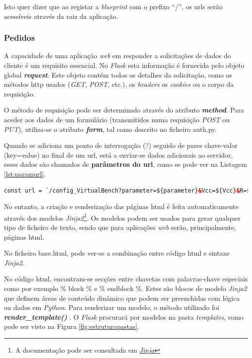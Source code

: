 Isto quer dizer que ao registar a \textit{blueprint} com o prefixo ``/'', os \acrshort{url}s serão acessíveis através da raiz da aplicação.

\subsubsection{Pedidos}
A capacidade de uma aplicação \textit{web} em responder a solicitações de dados do cliente é um requisito essencial. No \textit{Flask} esta informação é fornecida pelo objeto global \textit{\textbf{request}}. Este objeto contém todos os detalhes da solicitação, como os métodos \acrshort{http} usados (\textit{GET}, \textit{POST}, etc.), os \textit{headers} os \textit{cookies} ou o corpo da requisição.

O método de requisição pode ser determinado através do atributo \textit{\textbf{method}}. Para aceder aos dados de um formulário (transmitidos numa requisição \textit{POST} ou \textit{PUT}), utiliza-se o atributo \textit{\textbf{form}}, tal como descrito no ficheiro auth.py.

Quando se adiciona um ponto de interrogação (?) seguido de pares chave-valor (key=value) no final de um \acrshort{url}, está a enviar-se dados adicionais ao servidor, esses dados são chamados de \textbf{parâmetros do \acrshort{url}}, como se pode ver na Listagem \ref{lst:paramurl}.

\begin{minipage}{0.9\linewidth}
	\begin{lstlisting}[language=Html, caption=Exemplo argumentos passados ao servidor - ohm.html, label=lst:paramurl]
const url = `/config_VirtualBench?parameter=${parameter}&Vcc=${Vcc}&R=${Resistance}`;
\end{lstlisting}
\end{minipage}

No entanto, a criação e renderização das páginas \acrshort{html} é feita automaticamente através dos modelos \textit{Jinja2}\footnote{A documentação pode ser consultada em \href{https://jinja.palletsprojects.com/en/3.1.x/templates/}{\textit{Jinja}}}. Os modelos podem ser usados para gerar qualquer tipo de ficheiro de texto, sendo que para aplicações \textit{web} serão, principalmente, páginas \acrshort{html}.

No ficheiro base.html, pode ver-se a combinação entre código \acrshort{html} e sintaxe \textit{Jinja2}.

No código \acrshort{html}, encontram-se secções entre chavetas {} com palavras-chave especiais como por exemplo {\% block \%} e {\% endblock \%}. Estes são blocos de modelo \textit{Jinja2} que definem áreas de conteúdo dinâmico que podem ser preenchidas com lógica ou dados em \textit{Python}. Para renderizar um modelo, o método utilizado foi \textit{\textbf{render\_template()}} \cite{Flask}. O \textit{Flask} procurará por modelos na pasta \textit{templates}, como pode ser visto na Figura \ref{fig:estruturapastas}.

